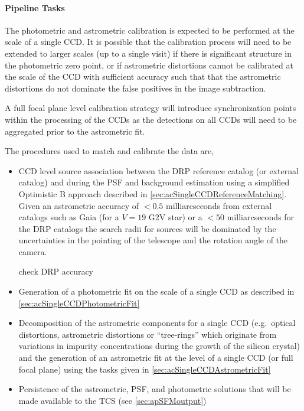 \paragraph{Pipeline Tasks}

The photometric and astrometric calibration is expected to be performed at the scale of a single CCD. It is possible that the calibration process will need to be extended to larger scales (up to a single visit) if there is significant structure in the photometric zero point, or if astrometric distortions cannot be calibrated at the scale of the CCD with sufficient accuracy such that that the astrometric distortions do not dominate the false positives in the image subtraction.

A full focal plane level calibration strategy will introduce synchronization points within the processing of the CCDs as the detections on all CCDs will need to be aggregated prior to the astrometric fit.

The procedures used to match and calibrate the data are,
\begin{itemize}
\item CCD level source association between the DRP reference catalog (or external catalog) and \Sources  during the PSF and background estimation using a simplified Optimistic B approach described in \ref{sec:acSingleCCDReferenceMatching}. Given an astrometric accuracy of $<0.5$ milliarcseconds from external catalogs such as Gaia (for a $V=19$ G2V star) or a $<50$ milliarcseconds for the DRP catalogs the search radii for sources will be dominated by the uncertainties in the pointing of the telescope and the rotation angle of the camera.
\begin{note} check DRP accuracy \end{note}
\item Generation of a photometric fit on the scale of a single CCD as described in \ref{sec:acSingleCCDPhotometricFit}
\item Decomposition of the astrometric components for a single CCD (e.g.\ optical distortions, astrometric distortions or ``tree-rings'' which originate from variations in impurity concentrations during the growth of the silicon crystal) and the generation of  an astrometric fit at the level of a single CCD (or full focal plane) using the tasks given in \ref{sec:acSingleCCDAstrometricFit}
\item Persistence of the astrometric, PSF, and photometric solutions that will be made available to the TCS (see \ref{sec:apSFMoutput})
\end{itemize}

